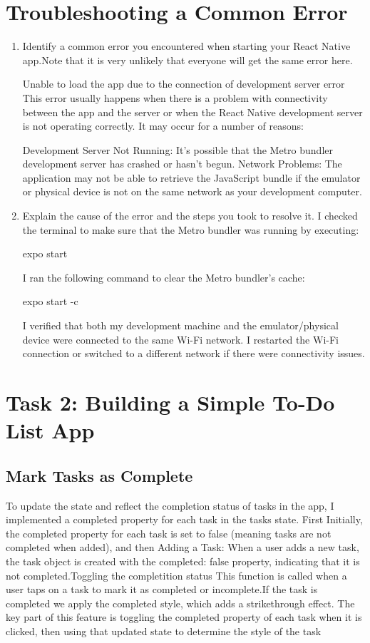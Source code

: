 \documentclass[a4paper,12pt]{article}
\begin{document}
\section{Troubleshooting a Common Error }
\begin{enumerate}
    \item Identify a common error you encountered when starting your React Native app.Note that it is very unlikely that everyone will get the same error here.

    Unable to load the app due to the connection of development server error
    This error usually happens when there is a problem with connectivity between the app and the server or when the React Native development server is not operating correctly. It may occur for a number of reasons:

Development Server Not Running: It's possible that the Metro bundler development server has crashed or hasn't begun.
Network Problems: The application may not be able to retrieve the JavaScript bundle if the emulator or physical device is not on the same network as your development computer.
    \item Explain the cause of the error and the steps you took to resolve it.
    I checked the terminal to make sure that the Metro bundler was running by executing:

expo start

I ran the following command to clear the Metro bundler's cache:

expo start -c

I verified that both my development machine and the emulator/physical device were connected to the same Wi-Fi network.
I restarted the Wi-Fi connection or switched to a different network if there were connectivity issues.
\end{enumerate}

\section {Task 2: Building a Simple To-Do List App}

\subsection{Mark Tasks as Complete }
To update the state and reflect the completion status of tasks in the app, I implemented a completed property for each task in the tasks state. First Initially, the completed property for each task is set to false (meaning tasks are not completed when added), and then Adding a Task: When a user adds a new task, the task object is created with the completed: false property, indicating that it is not completed.Toggling the completition status This function is called when a user taps on a task to mark it as completed or incomplete.If the task is completed we apply the completed style, which adds a strikethrough effect. The key part of this feature is toggling the completed property of each task when it is clicked, then using that updated state to determine the style of the task
\end{document}
